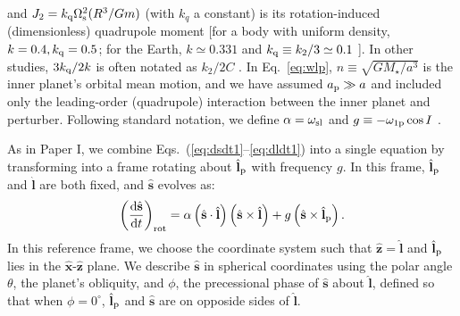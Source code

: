 \documentclass[
        fleqn,
        usenatbib,
    ]{mnras}
\newcommand*{\rd}[2]{\frac{\mathrm{d}#1}{\mathrm{d}#2}}
\newcommand*{\p}[1]{\left(#1\right)}
\newcommand*{\uv}[1]{\hat{\boldsymbol{\mathbf{#1}}}}
\begin{document}
and $J_2 = k_{\rm q}\Omega_{\rm s}^2 (R^3/Gm)$ (with $k_{q}$ a constant) is its
rotation-induced (dimensionless) quadrupole moment [for a body with uniform
density, $k=0.4, k_{\rm q}=0.5$; for the Earth, $k \simeq 0.331$ and $k_{\rm q}
\equiv k_2 / 3 \simeq 0.1$ \citep[e.g.][]{groten2004fundamental,
lainey2016quantification}]. In other studies, $3k_{\rm q} / 2 k$ is often
notated as $k_2 / 2C$ \citep[e.g.][]{millholland_disk}. In Eq.~\eqref{eq:wlp},
$n \equiv \sqrt{GM_\star/a^3}$ is the inner planet's orbital mean motion,  and
we have assumed $a_{\rm p}\gg a$ and included only the leading-order
(quadrupole) interaction between the inner planet and perturber. Following
standard notation, we define $\alpha = \omega_{\rm sl}$ and $g \equiv
-\omega_{\rm 1p} \cos I$ \citep[e.g.][]{colombo1966}.

As in Paper I, we combine Eqs.~(\ref{eq:dsdt1}--\ref{eq:dldt1}) into a
single equation by transforming into a frame rotating about $\uv{l}_{\rm p}$
with frequency $g$. In this frame, $\uv{l}_{\rm p}$ and $\uv{l}$ are both fixed,
and $\uv{s}$ evolves as:
\begin{equation}
    \p{\rd{\uv{s}}{t}}_{\rm rot}
        = \alpha\p{\uv{s} \cdot \uv{l}}\p{\uv{s} \times \uv{l}}
            + g\p{\uv{s} \times \uv{l}_{\rm p}}. \label{eq:dsdt_rot}
\end{equation}
In this reference frame, we choose the coordinate system such that $\uv{z} =
\uv{l}$ and $\uv{l}_{\rm p}$ lies in the $\uv{x}$-$\uv{z}$ plane. We describe
$\uv{s}$ in spherical coordinates using the polar angle $\theta$, the planet's
obliquity, and $\phi$, the precessional phase of $\uv{s}$ about $\uv{l}$,
defined so that when $\phi = 0^\circ$, $\uv{l}_{\rm p}$ and $\uv{s}$ are on
opposide sides of $\uv{l}$.
\end{document}
